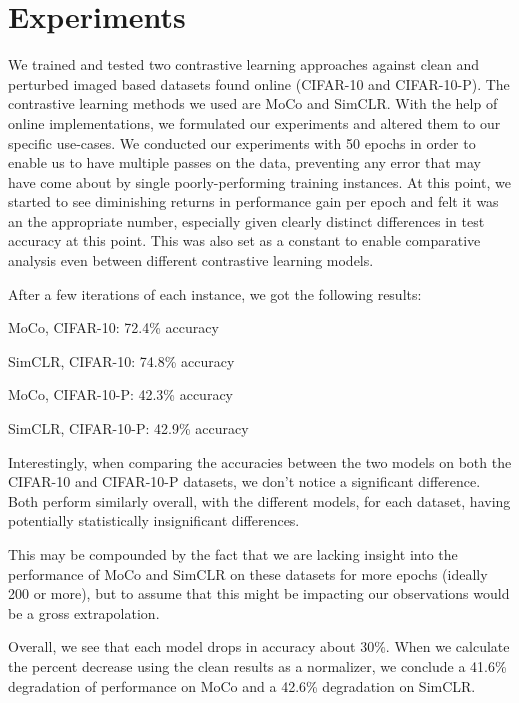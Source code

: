 \section{Experiments}

\begin{comment}
\begin{enumerate}
    \item Present the design and execution of your experiments.
    \item Report on the data collected and any statistical or analytical methods used.
    \item Provide sufficient detail for others to replicate your experiments.
\end{enumerate}
\end{comment}

We trained and tested two contrastive learning approaches against clean and perturbed imaged based datasets found online (CIFAR-10 and CIFAR-10-P). The contrastive learning methods we used are MoCo and SimCLR. With the help of online implementations, we formulated our experiments and altered them to our specific use-cases. We conducted our experiments with 50 epochs in order to enable us to have multiple passes on the data, preventing any error that may have come about by single poorly-performing training instances. At this point, we started to see diminishing returns in performance gain per epoch and felt it was an the appropriate number, especially given clearly distinct differences in test accuracy at this point. This was also set as a constant to enable comparative analysis even between different contrastive learning models.

After a few iterations of each instance, we got the following results:

\begin{multicols}{2}
MoCo, CIFAR-10: 72.4\% accuracy

SimCLR, CIFAR-10: 74.8\% accuracy

MoCo, CIFAR-10-P: 42.3\% accuracy

SimCLR, CIFAR-10-P: 42.9\% accuracy
\end{multicols}

Interestingly, when comparing the accuracies between the two models on both the CIFAR-10 and CIFAR-10-P datasets, we don't notice a significant difference. Both perform similarly overall, with the different models, for each dataset, having potentially statistically insignificant differences. 

This may be compounded by the fact that we are lacking insight into the performance of MoCo and SimCLR on these datasets for more epochs (ideally 200 or more), but to assume that this might be impacting our observations would be a gross extrapolation.

Overall, we see that each model drops in accuracy about 30\%. When we calculate the percent decrease using the clean results as a normalizer, we conclude a 41.6\% degradation of performance on MoCo and a 42.6\% degradation on SimCLR.
